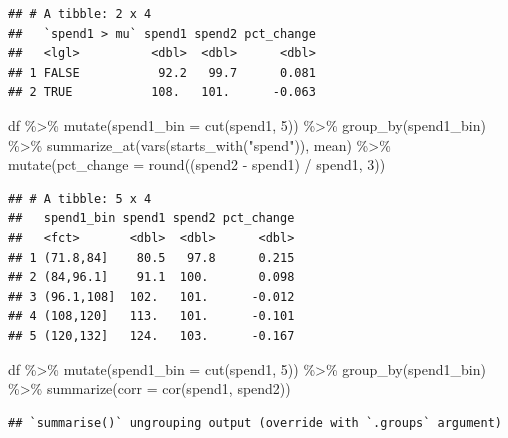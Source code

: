 \documentclass[
]{krantz}
\makeatletter
\newenvironment{Shaded}{\begin{snugshade}}{\end{snugshade}}
\newcommand{\AttributeTok}[1]{\textcolor[rgb]{0.61,0.61,0.61}{#1}}
\newcommand{\DecValTok}[1]{\textcolor[rgb]{0.06,0.06,0.06}{#1}}
\newcommand{\FunctionTok}[1]{\textcolor[rgb]{0,0,0}{#1}}
\newcommand{\NormalTok}[1]{#1}
\newcommand{\SpecialCharTok}[1]{\textcolor[rgb]{0,0,0}{#1}}
\newcommand{\StringTok}[1]{\textcolor[rgb]{0.5,0.5,0.5}{#1}}
\newenvironment{kframe}{%
\medskip{}
\setlength{\fboxsep}{.8em}
 \def\at@end@of@kframe{}%
 \ifinner\ifhmode%
  \def\at@end@of@kframe{\end{minipage}}%
  \begin{minipage}{\columnwidth}%
 \fi\fi%
 \def\FrameCommand##1{\hskip\@totalleftmargin \hskip-\fboxsep
 \colorbox{shadecolor}{##1}\hskip-\fboxsep
     \hskip-\linewidth \hskip-\@totalleftmargin \hskip\columnwidth}%
 \MakeFramed {\advance\hsize-\width
   \@totalleftmargin\z@ \linewidth\hsize
   \@setminipage}}%
 {\par\unskip\endMakeFramed%
 \at@end@of@kframe}
\renewenvironment{Shaded}{\begin{kframe}}{\end{kframe}}
\makeatother
\begin{document}
\begin{verbatim}
## # A tibble: 2 x 4
##   `spend1 > mu` spend1 spend2 pct_change
##   <lgl>          <dbl>  <dbl>      <dbl>
## 1 FALSE           92.2   99.7      0.081
## 2 TRUE           108.   101.      -0.063
\end{verbatim}

\begin{Shaded}
\begin{Highlighting}[]
\NormalTok{df }\SpecialCharTok{\%\textgreater{}\%}
  \FunctionTok{mutate}\NormalTok{(}\AttributeTok{spend1\_bin =} \FunctionTok{cut}\NormalTok{(spend1, }\DecValTok{5}\NormalTok{)) }\SpecialCharTok{\%\textgreater{}\%}
  \FunctionTok{group\_by}\NormalTok{(spend1\_bin) }\SpecialCharTok{\%\textgreater{}\%}
  \FunctionTok{summarize\_at}\NormalTok{(}\FunctionTok{vars}\NormalTok{(}\FunctionTok{starts\_with}\NormalTok{(}\StringTok{"spend"}\NormalTok{)), mean) }\SpecialCharTok{\%\textgreater{}\%}
  \FunctionTok{mutate}\NormalTok{(}\AttributeTok{pct\_change =} \FunctionTok{round}\NormalTok{((spend2 }\SpecialCharTok{{-}}\NormalTok{ spend1) }\SpecialCharTok{/}\NormalTok{ spend1, }\DecValTok{3}\NormalTok{))}
\end{Highlighting}
\end{Shaded}

\begin{verbatim}
## # A tibble: 5 x 4
##   spend1_bin spend1 spend2 pct_change
##   <fct>       <dbl>  <dbl>      <dbl>
## 1 (71.8,84]    80.5   97.8      0.215
## 2 (84,96.1]    91.1  100.       0.098
## 3 (96.1,108]  102.   101.      -0.012
## 4 (108,120]   113.   101.      -0.101
## 5 (120,132]   124.   103.      -0.167
\end{verbatim}

\begin{Shaded}
\begin{Highlighting}[]
\NormalTok{df }\SpecialCharTok{\%\textgreater{}\%}
  \FunctionTok{mutate}\NormalTok{(}\AttributeTok{spend1\_bin =} \FunctionTok{cut}\NormalTok{(spend1, }\DecValTok{5}\NormalTok{)) }\SpecialCharTok{\%\textgreater{}\%}
  \FunctionTok{group\_by}\NormalTok{(spend1\_bin) }\SpecialCharTok{\%\textgreater{}\%}
  \FunctionTok{summarize}\NormalTok{(}\AttributeTok{corr =} \FunctionTok{cor}\NormalTok{(spend1, spend2))}
\end{Highlighting}
\end{Shaded}

\begin{verbatim}
## `summarise()` ungrouping output (override with `.groups` argument)
\end{verbatim}
\end{document}
